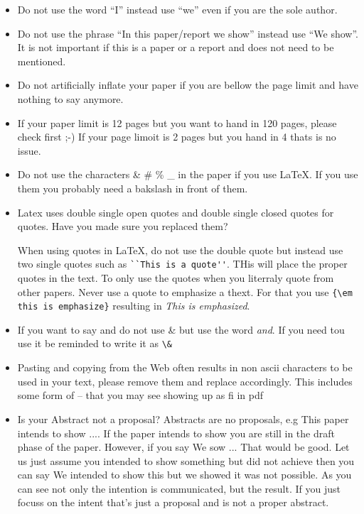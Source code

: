 \begin{itemize}[label=$\Box$]
\item Do not use the word ``I'' instead use ``we'' even if you are the
  sole author.

\item Do not use the phrase ``In this paper/report we show'' instead
  use ``We show''. It is not important if this is a paper or a report
  and does not need to be mentioned.

\item Do not artificially inflate your paper if you are bellow the
  page limit and have nothing to say anymore.

\item If your paper limit is 12 pages but you want to hand in 120
  pages, please check first ;-) If your page limoit is 2 pages but you
  hand in 4 thats is no issue.

\item Do not use the characters \& \# \% \_  in the paper if you use
  LaTeX. If you use them you probably need a bakslash in front of them.

\item Latex uses double single open quotes and double single closed
  quotes for quotes. Have you made sure you replaced them?

  When using quotes in LaTeX, do not use the double quote but instead
  use two single quotes such as \verb|``This is a quote''|. THis will
  place the proper quotes in the text. To only use the quotes when you
  literraly quote from other papers. Never use a quote to emphasize a
  thext. For that you use \verb|{\em this is emphasize}| resulting in
  {\em This is emphasized}.

\item If you want to say and do not use \& but use the word {\em
    and}. If you need tou use it be reminded to write it as \verb|\&|


\item Pasting and copying from the Web often results in non ascii
  characters to be used in your text, please remove them and replace
  accordingly. This includes some form of -- that you may see showing
  up as fi in pdf

\item Is your Abstract not a proposal? Abstracts are no proposals, e.g
  This paper intends to show .... If the paper intends to show you are
  still in the draft phase of the paper. However, if you say We sow
  ... That would be good. Let us just assume you intended to show
  something but did not achieve then you can say We intended to show
  this but we showed it was not possible. As you can see not only the
  intention is communicated, but the result. If you just focuss on the
  intent that's just a proposal and is not a proper abstract.


\end{itemize}
